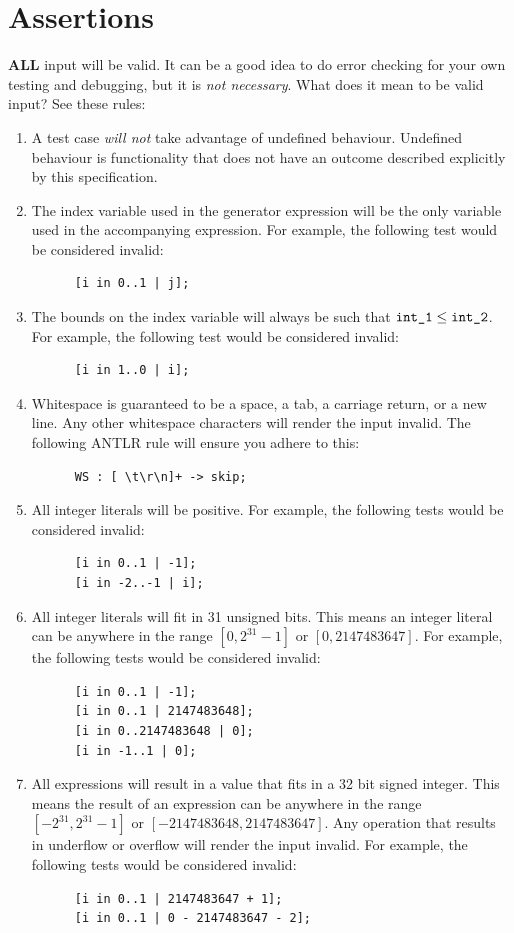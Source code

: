 \documentclass{article}
\newcommand{\code}[1]{\texttt{\textmd{#1}}}
\begin{document}
\section{Assertions}
\textbf{ALL} input will be valid. It can be a good idea to do error checking for your own
testing and debugging, but it is \textit{not necessary}. What does it mean to be valid input?
See these rules:
\begin{enumerate}
  \item
    A test case \textit{will not} take advantage of undefined behaviour. Undefined behaviour is
    functionality that does not have an outcome described explicitly by this specification.
  \item
    The index variable used in the generator expression will be the only variable used in the
    accompanying expression. For example, the following test would be considered invalid:
    \begin{lstlisting}
      [i in 0..1 | j];
    \end{lstlisting}
  \item
    The bounds on the index variable will always be such that $\code{int\_1} \leq
    \code{int\_2}$. For example, the following test would be considered invalid:
    \begin{lstlisting}
      [i in 1..0 | i];
    \end{lstlisting}
  \item
    Whitespace is guaranteed to be a space, a tab, a carriage return, or a new
    line. Any other whitespace characters will render the input invalid. The following ANTLR rule
    will ensure you adhere to this:
    \begin{lstlisting}
      WS : [ \t\r\n]+ -> skip;
    \end{lstlisting}
  \item
    All integer literals will be positive. For example, the following tests would be considered
    invalid:
    \begin{lstlisting}
      [i in 0..1 | -1];
      [i in -2..-1 | i];
    \end{lstlisting}
  \item
    All integer literals will fit in 31 unsigned bits. This means an integer literal can be
    anywhere in the range $[0, 2^{31} - 1]$ or $[0, 2147483647]$. For example, the following tests
    would be considered invalid:
    \begin{lstlisting}
      [i in 0..1 | -1];
      [i in 0..1 | 2147483648];
      [i in 0..2147483648 | 0];
      [i in -1..1 | 0];
    \end{lstlisting}
  \item
    All expressions will result in a value that fits in a 32 bit signed integer. This means the
    result of an expression can be anywhere in the range $[-2^{31}, 2^{31} - 1]$ or $[-2147483648,
    2147483647]$. Any operation that results in underflow or overflow will render the input
    invalid. For example, the following tests would be considered invalid:
    \begin{lstlisting}
      [i in 0..1 | 2147483647 + 1];
      [i in 0..1 | 0 - 2147483647 - 2];
    \end{lstlisting}
\end{enumerate}
\end{document}

